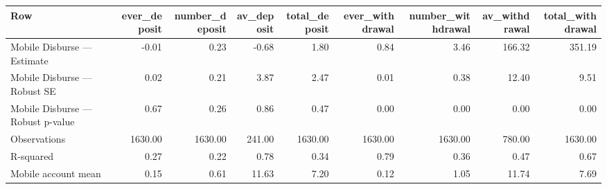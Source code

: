 
\begin{tabular}{lrrrrrrrr}
\toprule
Row & ever\_deposit & number\_deposit & av\_deposit & total\_deposit & ever\_withdrawal & number\_withdrawal & av\_withdrawal & total\_withdrawal\\
\midrule
Mobile Disburse — Estimate & -0.01 & 0.23 & -0.68 & 1.80 & 0.84 & 3.46 & 166.32 & 351.19\\
Mobile Disburse — Robust SE & 0.02 & 0.21 & 3.87 & 2.47 & 0.01 & 0.38 & 12.40 & 9.51\\
Mobile Disburse — Robust p-value & 0.67 & 0.26 & 0.86 & 0.47 & 0.00 & 0.00 & 0.00 & 0.00\\
Observations & 1630.00 & 1630.00 & 241.00 & 1630.00 & 1630.00 & 1630.00 & 780.00 & 1630.00\\
R-squared & 0.27 & 0.22 & 0.78 & 0.34 & 0.79 & 0.36 & 0.47 & 0.67\\
\addlinespace
Mobile account mean & 0.15 & 0.61 & 11.63 & 7.20 & 0.12 & 1.05 & 11.74 & 7.69\\
\bottomrule
\end{tabular}
